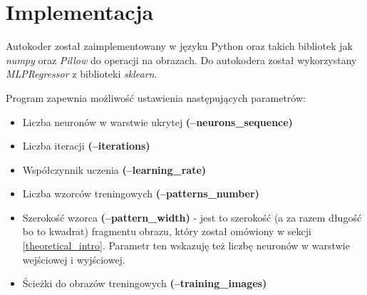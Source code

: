 \documentclass{classrep}
\begin{document}
    \section{Implementacja} {
        Autokoder został zaimplementowany w języku Python oraz takich bibliotek jak
        \textit{numpy} oraz \textit{Pillow} do operacji na obrazach. Do autokodera
        został wykorzystany \textit{MLPRegressor} z biblioteki \textit{sklearn}.

        Program zapewnia możliwość ustawienia następujących parametrów:
        \begin{itemize}
            \item Liczba neuronów w warstwie ukrytej \textbf{(--neurons\_sequence)}
            \item Liczba iteracji \textbf{(--iterations)}
            \item Współczynnik uczenia \textbf{(--learning\_rate)}
            \item Liczba wzorców treningowych \textbf{(--patterns\_number)}
            \item Szerokość wzorca \textbf{(--pattern\_width)} - jest to szerokość
            (a za razem długość bo to kwadrat) fragmentu obrazu, który został omówiony w
            sekcji \ref{theoretical_intro}. Parametr ten wskazuję też liczbę neuronów w
            warstwie wejściowej i wyjściowej.
            \item Ścieżki do obrazów treningowych \textbf{(--training\_images)}
        \end{itemize}
    }
\end{document}
